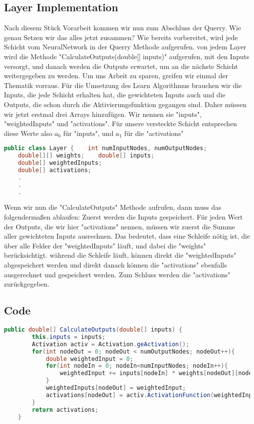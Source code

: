 \documentclass[12pt]{article}
\begin{document}
\subsection{Layer Implementation}
Nach diesem Stück Vorarbeit kommen wir nun zum Abschluss der Querry. Wie genau Setzen wir das alles jetzt zusammen?
Wie bereits vorbereitet, wird jede Schicht vom NeuralNetwork in der Querry Methode aufgerufen. von jedem Layer wird die Methode "CalculateOutputs(double[] inputs)" aufgerufen, mit den Inputs versorgt, und danach werden die Outputs erwartet, um an die nächste Schicht weitergegeben zu werden.
Um uns Arbeit zu sparen, greifen wir einmal der Thematik vorraus. Für die Umsetzung des Learn Algorithmus brauchen wir die Inputs, die jede Schicht erhalten hat, die gewichteten Inputs auch und die Outputs, die schon durch die Aktivierungsfunktion gegangen sind. Daher müssen wir jetzt erstmal drei Arrays hinzufügen. Wir nennen sie "inputs", "weightedInputs" und "activations". Für unsere versteckte Schicht entsprechen diese Werte also $a_0$ für "inputs", und $a_1$ für die "activations"
\begin{lstlisting}[language=Java]
public class Layer {    int numInputNodes, numOutputNodes;
    double[][] weights;    double[] inputs;
    double[] weightedInputs;
    double[] activations;
    .
    .
    .
\end{lstlisting}Wenn wir nun die "CalculateOutputs" Methode aufrufen, dann muss das folgendermaßen ablaufen:
Zuerst werden die Inputs gespeichert.
Für jeden Wert der Outputs, die wir hier "activations" nennen, müssen wir zuerst die Summe aller gewichteten Inputs ausrechnen. Das bedeutet, dass eine Schleife nötig ist, die über alle Felder der "weightedInputs" läuft, und dabei die "weights" berücksichtigt. während die Schleife läuft, können direkt die "weightedInputs" abgespeichert werden und direkt danach können die "activations" ebenfalls ausgerechnet und gespeichert werden. Zum Schluss werden die "activations" zurückgegeben.
\subsection{ Code}
\begin{lstlisting}[language=Java]
    public double[] CalculateOutputs(double[] inputs) {
        this.inputs = inputs;
        Activation activ = Activation.geActivation();
        for(int nodeOut = 0; nodeOut < numOutputNodes; nodeOut++){
            double weightedInput = 0;
            for(int nodeIn = 0; nodeIn<numInputNodes; nodeIn++){
                weightedInput += inputs[nodeIn] * weights[nodeOut][nodeIn];
            }
            weightedInputs[nodeOut] = weightedInput;
            activations[nodeOut] = activ.ActivationFunction(weightedInput);
        }
        return activations;
    }
\end{lstlisting}
\end{document}
